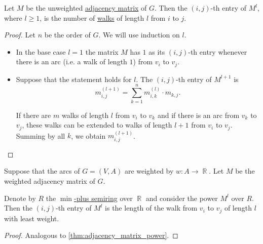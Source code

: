 \begin{proposition}\label{thm:adjacency_matrix_power}
  Let \( M \) be the unweighted \hyperref[def:graph_adjacency_matrix]{adjacency matrix} of \( G \). Then the \( (i, j) \)-th entry of \( M^l \), where \( l \geq 1 \), is the number of \hyperref[def:graph_walk]{walks} of length \( l \) from \( i \) to \( j \).
\end{proposition}
\begin{proof}
  Let \( n \) be the order of \( G \). We will use induction on \( l \).
  \begin{itemize}
    \item In the base case \( l = 1 \) the matrix \( M \) has \( 1 \) as its \( (i,j) \)-th entry whenever there is an arc (i.e. a walk of length \( 1 \)) from \( v_i \) to \( v_j \).

    \item Suppose that the statement holds for \( l \). The \( (i, j) \)-th entry of \( M^{l+1} \) is
    \begin{equation*}
      m^{(l+1)}_{i,j} = \sum_{k=1}^n m^{(l)}_{i,k} \cdot m_{k,j}.
    \end{equation*}

    If there are \( m \) walks of length \( l \) from \( v_i \) to \( v_k \) and if there is an arc from \( v_k \) to \( v_j \), these walks can be extended to walks of length \( l + 1 \) from \( v_i \) to \( v_j \). Summing by all \( k \), we obtain \( m^{(l+1)}_{i,j} \).
  \end{itemize}
\end{proof}

\begin{proposition}\label{thm:adjacency_matrix_tropical_power}
  Suppose that the arcs of \( G = (V, A) \) are weighted by \( w: A \to \BbbR \). Let \( M \) be the weighted adjacency matrix of \( G \).

  Denote by \( R \) the \hyperref[def:tropical_semiring]{\( \min \)-plus semiring} over \( \BbbR \) and consider the power \( M^l \) over \( R \). Then the \( (i, j) \)-th entry of \( M^l \) is the length of the walk from \( v_i \) to \( v_j \) of length \( l \) with least weight.
\end{proposition}
\begin{proof}
  Analogous to \cref{thm:adjacency_matrix_power}.
\end{proof}

